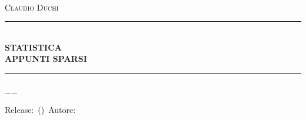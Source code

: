 \documentclass[a4paper,oneside]{book}%
\date{\datetime}
\newcommand{\HRule}{\rule{\linewidth}{0.5mm}}
\begin{document}
\frontmatter
		\hypersetup{pageanchor=false}
\begin{titlepage}
	\begin{center}	
		\Lgrandedue\\[1cm]    
		\textsc{\LARGE Claudio Duchi}\\[1.4cm]
		\HRule \\[0.4cm]
		{ \huge \bfseries STATISTICA}\\[0.4cm]
		{ \huge \bfseries APPUNTI SPARSI}\\[0.4cm]
		\HRule \\
		\vfill
		{\large $-$\DTMnow$-$}	
	\end{center}
	{\centering
		Release:\gitReln\ (\gitAbbrevHash)\ Autore:\gitAuthorName\ 
		\gitCommitterDate \\
	}
\end{titlepage}
\hypersetup{pageanchor=true}
%	
	\CDcopyright
	\listoffigures
	\listoftables

	\tableofcontents
	\mainmatter
	
%
%	
\nocite{*}
\printbibliography
{}
	\printindex
\end{document}
